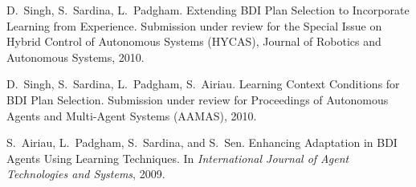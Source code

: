 \documentclass[a4paper]{article}
\begin{document}
\begin{thebibliography}{10}

D.~Singh, S.~Sardina, L.~Padgham.
\newblock Extending BDI Plan Selection to Incorporate Learning from Experience.
\newblock Submission under review for the Special Issue on Hybrid Control of Autonomous Systems (HYCAS), Journal of Robotics and Autonomous Systems, 2010.

D.~Singh, S.~Sardina, L.~Padgham, S.~Airiau.
\newblock Learning Context Conditions for {BDI} Plan Selection.
\newblock Submission under review for Proceedings of Autonomous Agents and Multi-Agent Systems (AAMAS), 2010.

S.~Airiau, L.~Padgham, S.~Sardina, and S.~Sen.
\newblock Enhancing Adaptation in {BDI} Agents Using Learning Techniques.
\newblock In {\em International Journal of Agent Technologies and Systems},
2009.

\end{thebibliography}
\end{document}
